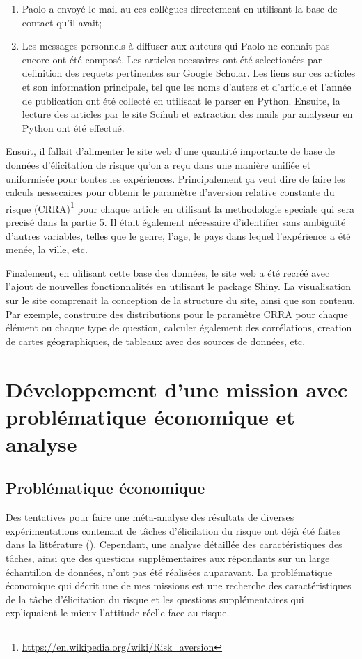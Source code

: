 \documentclass[12pt]{article}
\begin{document}
\begin{enumerate}
\item Paolo a envoyé le mail au ces collègues directement en utilisant la base de contact qu'il avait;
\item Les messages personnels à diffuser aux auteurs qui Paolo ne connait pas encore ont été composé. Les articles neessaires ont été selectionées par definition des requets pertinentes sur Google Scholar. Les liens sur ces articles et son information principale, tel que les noms d'auters et d'article et l'année de publication ont été collecté en utilisant le parser en Python. Ensuite, la lecture des articles par le site Scihub et extraction des mails par analyseur en Python ont été effectué. 
\end{enumerate}

Ensuit, il fallait d'alimenter le site web d'une quantité importante de
base de données d'élicitation de risque qu'on a reçu dans une manière
unifiée et uniformisée pour toutes les expériences. Principalement ça
veut dire de faire les calculs nessecaires pour obtenir le paramètre
d'aversion relative constante du risque (CRRA)\footnote{\url{https://en.wikipedia.org/wiki/Risk_aversion}}
pour chaque article en utilisant la methodologie speciale qui sera
precisé dans la partie 5. Il était également nécessaire d'identifier
sans ambiguïté d'autres variables, telles que le genre, l'age, le pays
dans lequel l'expérience a été menée, la ville, etc.

Finalement, en ulilisant cette base des données, le site web a été
recréé avec l'ajout de nouvelles fonctionnalités en utilisant le package
Shiny. La visualisation sur le site comprenait la conception de la
structure du site, ainsi que son contenu. Par exemple, construire des
distributions pour le paramètre CRRA pour chaque élément ou chaque type
de question, calculer également des corrélations, creation de cartes
géographiques, de tableaux avec des sources de données, etc.

\section{Développement d’une mission avec problématique économique et analyse}
\label{sec:fourth}

\subsection{Problématique économique}

Des tentatives pour faire une méta-analyse des résultats de diverses
expérimentations contenant de tâches d'élicilation du risque ont déjà
été faites dans la littérature (\citet{CroFil2013b}). Cependant, une
analyse détaillée des caractéristiques des tâches, ainsi que des
questions supplémentaires aux répondants sur un large échantillon de
données, n'ont pas été réalisées auparavant. La problématique économique
qui décrit une de mes missions est une recherche des caractéristiques de
la tâche d'élicitation du risque et les questions supplémentaires qui
expliquaient le mieux l'attitude réelle face au risque.
\end{document}
